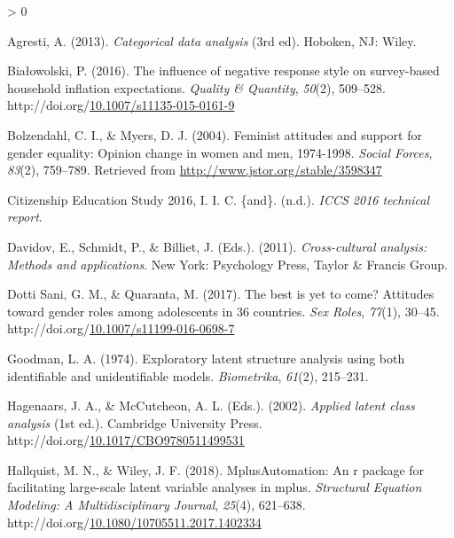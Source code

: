 \documentclass[12pt,a4paper,oneside]{reedthesis}
\newlength{\cslhangindent}
\newenvironment{CSLReferences}[2] %
 {%
  \setlength{\parindent}{0pt}
  \ifodd #1 \everypar{\setlength{\hangindent}{\cslhangindent}}\ignorespaces\fi
  \ifnum #2 > 0
  \setlength{\parskip}{#2\baselineskip}
  \fi
 }%
 {}
\begin{document}
\hypertarget{refs}{}
\begin{CSLReferences}{1}{0}
\leavevmode\hypertarget{ref-agresti_categorical_2013}{}%
Agresti, A. (2013). \emph{Categorical data analysis} (3rd ed). Hoboken, {NJ}: Wiley.

\leavevmode\hypertarget{ref-bialowolski_influence_2016}{}%
Białowolski, P. (2016). The influence of negative response style on survey-based household inflation expectations. \emph{Quality \& Quantity}, \emph{50}(2), 509--528. http://doi.org/\href{https://doi.org/10.1007/s11135-015-0161-9}{10.1007/s11135-015-0161-9}

\leavevmode\hypertarget{ref-bolzendahl_feminist_2004}{}%
Bolzendahl, C. I., \& Myers, D. J. (2004). Feminist attitudes and support for gender equality: Opinion change in women and men, 1974-1998. \emph{Social Forces}, \emph{83}(2), 759--789. Retrieved from \url{http://www.jstor.org/stable/3598347}

\leavevmode\hypertarget{ref-iea_international_civic_and_citizenship_education_study_2016_iccs_nodate}{}%
Citizenship Education Study 2016, I. I. C. \{and\}. (n.d.). \emph{{ICCS} 2016 technical report}.

\leavevmode\hypertarget{ref-davidov_cross-cultural_2011}{}%
Davidov, E., Schmidt, P., \& Billiet, J. (Eds.). (2011). \emph{Cross-cultural analysis: Methods and applications}. New York: Psychology Press, Taylor \& Francis Group.

\leavevmode\hypertarget{ref-dotti_sani_best_2017}{}%
Dotti Sani, G. M., \& Quaranta, M. (2017). The best is yet to come? Attitudes toward gender roles among adolescents in 36 countries. \emph{Sex Roles}, \emph{77}(1), 30--45. http://doi.org/\href{https://doi.org/10.1007/s11199-016-0698-7}{10.1007/s11199-016-0698-7}

\leavevmode\hypertarget{ref-goodman_exploratory_1974}{}%
Goodman, L. A. (1974). Exploratory latent structure analysis using both identifiable and unidentifiable models. \emph{Biometrika}, \emph{61}(2), 215--231.

\leavevmode\hypertarget{ref-hagenaars_applied_2002}{}%
Hagenaars, J. A., \& McCutcheon, A. L. (Eds.). (2002). \emph{Applied latent class analysis} (1st ed.). Cambridge University Press. http://doi.org/\href{https://doi.org/10.1017/CBO9780511499531}{10.1017/CBO9780511499531}

\leavevmode\hypertarget{ref-hallquist_mplusautomation_2018}{}%
Hallquist, M. N., \& Wiley, J. F. (2018). {MplusAutomation}: An r package for facilitating large-scale latent variable analyses in mplus. \emph{Structural Equation Modeling: A Multidisciplinary Journal}, \emph{25}(4), 621--638. http://doi.org/\href{https://doi.org/10.1080/10705511.2017.1402334}{10.1080/10705511.2017.1402334}


\end{CSLReferences}
\end{document}
